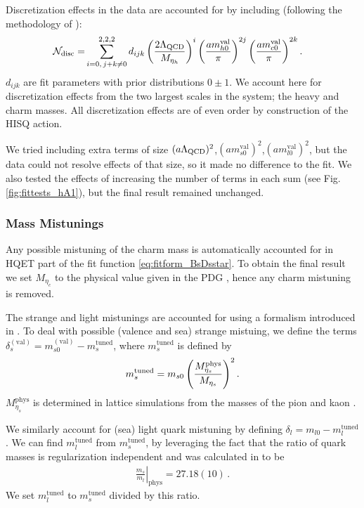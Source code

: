 Discretization effects in the data are accounted for by including (following the methodology of \cite{McNeile:2012qf}):
\begin{align}
    \label{eq:fitfun_hA1}
  \mathcal{N}_{\text{disc}} = &\sum_{i=0,\,j+k\neq 0}^{2,2,2} d_{ijk} \left({2\Lambda_{\text{QCD}}\over M_{\eta_h} }\right)^{i} \left({ am^{\text{val}}_{h0} \over \pi }\right)^{2j} \left({ am^{\text{val}}_{c0} \over \pi }\right)^{2k}.
\end{align}
$d_{ijk}$ are fit parameters with prior distributions $0\pm 1$. We account here for discretization effects from the two largest scales in the system; the heavy and charm masses. All discretization effects are of even order by construction of the HISQ action.

We tried including extra terms of size $(a\Lambda_{\text{QCD}})^2$,$(am^{\text{val}}_{s0})^2$,$(am^{\text{val}}_{l0})^2$, but the data could not resolve effects of that size, so it made no difference to the fit. We also tested the effects of increasing the number of terms in each sum (see Fig. \ref{fig:fittests_hA1}), but the final result remained unchanged.

\subsubsection{Mass Mistunings}
\label{sec:mistuning_BsDsstar}

Any possible mistuning of the charm mass is automatically accounted for in HQET part of the fit function \eqref{eq:fitform_BsDsstar}. To obtain the final result we set $M_{\eta_c}$ to the physical value given in the PDG \cite{PhysRevD.98.030001}, hence any charm mistuning is removed.

The strange and light mistunings are accounted for using a formalism introduced in \cite{Chakraborty:2014aca}. To deal with possible (valence and sea) strange mistuing, we define the terms $\delta^{(\text{val})}_s = m^{(\text{val})}_{s0}- m_s^{\text{tuned}}$, where $m_s^{\text{tuned}}$ is defined by
\begin{align}
  m_s^{\text{tuned}} = m_{s0} \left({ M^{\text{phys}}_{\eta_s} \over M_{\eta_s} }\right)^2.
  \label{eq:strange_mistuning}
\end{align}
$M_{\eta_s}^{\text{phys}}$ is determined in lattice simulations from the masses of the pion and kaon \cite{Dowdall:2013rya}.

We similarly account for (sea) light quark mistuning by defining $\delta_l = m_{l0} - m_l^{\text{tuned}}$. We can find $m_l^{\text{tuned}}$ from $m_s^{\text{tuned}}$, by leveraging the fact that the ratio of quark masses is regularization independent and was calculated in \cite{Bazavov:2017lyh} to be
\begin{align}
  \left.\frac{m_s}{m_l}\right\rvert_{\textrm{phys}} = 27.18(10)\,.
\end{align}
We set $m_l^{\text{tuned}}$ to $m_s^{\text{tuned}}$ divided by this ratio.

